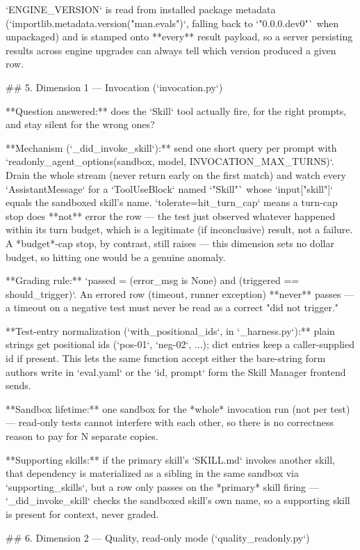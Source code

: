`ENGINE_VERSION` is read from installed package metadata (`importlib.metadata.version("man.evals")`, falling back to `"0.0.0.dev0"` when unpackaged) and is stamped onto **every** result payload, so a server persisting results across engine upgrades can always tell which version produced a given row.

## 5. Dimension 1 — Invocation (`invocation.py`)

**Question answered:** does the `Skill` tool actually fire, for the right prompts, and stay silent for the wrong ones?

**Mechanism (`_did_invoke_skill`):** send one short query per prompt with `readonly_agent_options(sandbox, model, INVOCATION_MAX_TURNS)`. Drain the whole stream (never return early on the first match) and watch every `AssistantMessage` for a `ToolUseBlock` named `"Skill"` whose `input["skill"]` equals the sandboxed skill's name. `tolerate=hit_turn_cap` means a turn-cap stop does **not** error the row — the test just observed whatever happened within its turn budget, which is a legitimate (if inconclusive) result, not a failure. A *budget*-cap stop, by contrast, still raises — this dimension sets no dollar budget, so hitting one would be a genuine anomaly.

**Grading rule:** `passed = (error_msg is None) and (triggered == should_trigger)`. An errored row (timeout, runner exception) **never** passes — a timeout on a negative test must never be read as a correct "did not trigger."

**Test-entry normalization (`with_positional_ids`, in `_harness.py`):** plain strings get positional ids (`pos-01`, `neg-02`, ...); dict entries keep a caller-supplied id if present. This lets the same function accept either the bare-string form authors write in `eval.yaml` or the `{id, prompt}` form the Skill Manager frontend sends.

**Sandbox lifetime:** one sandbox for the *whole* invocation run (not per test) — read-only tests cannot interfere with each other, so there is no correctness reason to pay for N separate copies.

**Supporting skills:** if the primary skill's `SKILL.md` invokes another skill, that dependency is materialized as a sibling in the same sandbox via `supporting_skills`, but a row only passes on the *primary* skill firing — `_did_invoke_skill` checks the sandboxed skill's own name, so a supporting skill is present for context, never graded.

## 6. Dimension 2 — Quality, read-only mode (`quality_readonly.py`)

